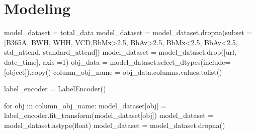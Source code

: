 \documentclass[
  letterpaper,
  DIV=11,
  numbers=noendperiod]{scrartcl}
\newenvironment{Shaded}{\begin{snugshade}}{\end{snugshade}}
\newcommand{\BuiltInTok}[1]{\textcolor[rgb]{0.00,0.23,0.31}{#1}}
\newcommand{\ControlFlowTok}[1]{\textcolor[rgb]{0.00,0.23,0.31}{#1}}
\newcommand{\DecValTok}[1]{\textcolor[rgb]{0.68,0.00,0.00}{#1}}
\newcommand{\KeywordTok}[1]{\textcolor[rgb]{0.00,0.23,0.31}{#1}}
\newcommand{\NormalTok}[1]{\textcolor[rgb]{0.00,0.23,0.31}{#1}}
\newcommand{\OperatorTok}[1]{\textcolor[rgb]{0.37,0.37,0.37}{#1}}
\newcommand{\StringTok}[1]{\textcolor[rgb]{0.13,0.47,0.30}{#1}}
\begin{document}
\hypertarget{modeling}{%
\section{Modeling}\label{modeling}}

\begin{Shaded}
\begin{Highlighting}[]
\NormalTok{model\_dataset }\OperatorTok{=}\NormalTok{ total\_data}
\NormalTok{model\_dataset }\OperatorTok{=}\NormalTok{ model\_dataset.dropna(subset }\OperatorTok{=}\NormalTok{ [}\StringTok{\textquotesingle{}B365A\textquotesingle{}}\NormalTok{, }\StringTok{\textquotesingle{}BWH\textquotesingle{}}\NormalTok{, }\StringTok{\textquotesingle{}WHH\textquotesingle{}}\NormalTok{, }\StringTok{\textquotesingle{}VCD\textquotesingle{}}\NormalTok{,}\StringTok{\textquotesingle{}BbMx\textgreater{}2.5\textquotesingle{}}\NormalTok{,}
                             \StringTok{\textquotesingle{}BbAv\textgreater{}2.5\textquotesingle{}}\NormalTok{, }\StringTok{\textquotesingle{}BbMx\textless{}2.5\textquotesingle{}}\NormalTok{, }\StringTok{\textquotesingle{}BbAv\textless{}2.5\textquotesingle{}}\NormalTok{, }\StringTok{\textquotesingle{}std\_attend\textquotesingle{}}\NormalTok{, }\StringTok{\textquotesingle{}standard\_attend\textquotesingle{}}\NormalTok{])}
\NormalTok{model\_dataset }\OperatorTok{=}\NormalTok{ model\_dataset.drop([}\StringTok{\textquotesingle{}url\textquotesingle{}}\NormalTok{, }\StringTok{\textquotesingle{}date\_time\textquotesingle{}}\NormalTok{], axis }\OperatorTok{=}\DecValTok{1}\NormalTok{)}
\NormalTok{obj\_data }\OperatorTok{=}\NormalTok{ model\_dataset.select\_dtypes(include}\OperatorTok{=}\NormalTok{[}\StringTok{\textquotesingle{}object\textquotesingle{}}\NormalTok{]).copy()}
\NormalTok{column\_obj\_name }\OperatorTok{=}\NormalTok{ obj\_data.columns.values.tolist()}

\NormalTok{label\_encoder }\OperatorTok{=}\NormalTok{ LabelEncoder()}


\ControlFlowTok{for}\NormalTok{ obj }\KeywordTok{in}\NormalTok{ column\_obj\_name:}
\NormalTok{    model\_dataset[obj] }\OperatorTok{=}\NormalTok{ label\_encoder.fit\_transform(model\_dataset[obj])}
\NormalTok{model\_dataset }\OperatorTok{=}\NormalTok{ model\_dataset.astype(}\BuiltInTok{float}\NormalTok{)}
\NormalTok{model\_dataset }\OperatorTok{=}\NormalTok{ model\_dataset.dropna()}



\end{Highlighting}
\end{Shaded}
\end{document}
